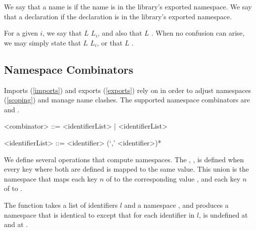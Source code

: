 \documentclass[makeidx]{article}
\begin{document}
{\LMHash{}%
We say that a name is 
if the name is in the library's exported namespace.
We say that a declaration 
if the declaration is in the library's exported namespace.

\LMHash{}%
For a given $i$,
we say that $L$
$L_i$, and also that $L$
.
When no confusion can arise, we may simply state
that $L$  $L_i$, or
that $L$  .


\subsection{Namespace Combinators}

\LMHash{}%
Imports (\ref{imports}) and exports (\ref{exports}) rely on
in order to adjust namespaces
(\ref{scoping})
and manage name clashes.
The supported namespace combinators are \SHOW{} and \HIDE{}.

\begin{grammar}
<combinator> ::= \SHOW{} <identifierList> | \HIDE{} <identifierList>

<identifierList> ::= <identifier> (`,' <identifier>)*
\end{grammar}

\LMHash{}%
We define several operations that compute namespaces.
The
,
,
is defined when every key where both are defined is mapped to the same value.
This union is the namespace that maps
each key $n$ of 
to the corresponding value ,
and each key $n$ of 
to .


\LMHash{}%
The function
takes a list of identifiers $l$ and a namespace ,
and produces a namespace  that is
identical to  except that for each identifier \id{} in $l$,
 is undefined at \id{} and at \code{\id=}.

}
\end{document}

